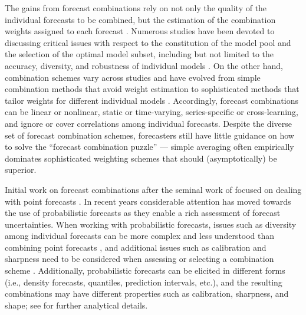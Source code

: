 \documentclass[a4paper,11pt]{article}
\begin{document}
The gains from forecast combinations rely on not only the quality of the individual forecasts to be combined, but the estimation of the combination weights assigned to each forecast \citep{Timmermann2006-en,Cang2014-tp}. Numerous studies have been devoted to discussing critical issues with respect to the constitution of the model pool and the selection of the optimal model subset, including but not limited to the accuracy, diversity, and robustness of individual models \citep{Batchelor1995-ps,Mannes2014-dl,Thomson2019-al,Lichtendahl2020-ut,Kang2021-ol}. On the other hand, combination schemes vary across studies and have evolved from simple combination methods that avoid weight estimation \citep[e.g.,][]{Clemen1986-pd,Palm1992-im,Genre2013-ut,Grushka-Cockayne2017-dj,Petropoulos2020-fp} to sophisticated methods that tailor weights for different individual models \citep[e.g.,][]{Bates1969-yj,Newbold1974-lp,Kolassa2011-ai,Li2020-od,Montero-Manso2020-tq,Kang2021-ol,Wang2021-un}. Accordingly, forecast combinations can be linear or nonlinear, static or time-varying, series-specific or cross-learning, and ignore or cover correlations among individual forecasts. Despite the diverse set of forecast combination schemes, forecasters still have little guidance on how to solve the ``forecast combination puzzle'' \citep{Stock2004-rq,Smith2009-wd,Claeskens2016-pv,Chan2018-jl} --- simple averaging often empirically dominates sophisticated weighting schemes that should (asymptotically) be superior.

Initial work on forecast combinations after the seminal work of \citet{Bates1969-yj} focused on dealing with point forecasts \citep[see, for example,][]{Clemen1989-fb,Timmermann2006-en}. In recent years considerable attention has moved towards the use of probabilistic forecasts \citep[e.g.,][]{Hall2007-lh,Gneiting2013-hl,Kapetanios2015-bb,Martin2021-yi} as they enable a rich assessment of forecast uncertainties. When working with probabilistic forecasts, issues such as diversity among individual forecasts can be more complex and less understood than combining point forecasts \citep{Ranjan2010-jl}, and additional issues such as calibration and sharpness need to be considered when assessing or selecting a combination scheme \citep{Gneiting2007-fr}. Additionally, probabilistic forecasts can be elicited in different forms (i.e., density forecasts, quantiles, prediction intervals, etc.), and the resulting combinations may have different properties such as calibration, sharpness, and shape; see \citet{Lichtendahl2013-rt} for further analytical details.
\end{document}
